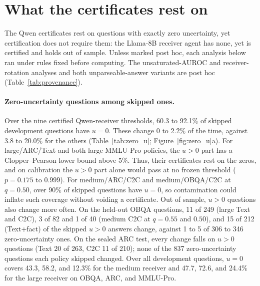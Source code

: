 \section{What the certificates rest on}\label{app:restson}

The Qwen certificates rest on questions with exactly zero uncertainty, yet certification does not require them: the Llama-8B receiver agent has none, yet is certified and holds out of sample. Unless marked post hoc, each analysis below ran under rules fixed before computing. The unsaturated-AUROC and receiver-rotation analyses and both unparseable-answer variants are post hoc (Table~\ref{tab:provenance}).

\paragraph{Zero-uncertainty questions among skipped ones.} Over the nine certified Qwen-receiver thresholds, 60.3 to 92.1\% of skipped development questions have $u=0$. These change 0 to 2.2\% of the time, against 3.8 to 20.0\% for the others (Table~\ref{tab:zero_u}; Figure~\ref{fig:zero_u}a). For large/ARC/Text and both large MMLU-Pro policies, the $u>0$ part has a Clopper--Pearson lower bound above 5\%. Thus, their certificates rest on the zeros, and on calibration the $u>0$ part alone would pass at no frozen threshold ($p=0.175$ to $0.999$). For medium/ARC/C2C and medium/OBQA/C2C at $q=0.50$, over 90\% of skipped questions have $u=0$, so contamination \citep{deng2024contamination} could inflate such coverage without voiding a certificate. Out of sample, $u>0$ questions also change more often. On the held-out OBQA questions, 11 of 249 (large Text and C2C), 3 of 82 and 1 of 40 (medium C2C at $q=0.55$ and $0.50$), and 15 of 212 (Text+fact) of the skipped $u>0$ answers change, against 1 to 5 of 306 to 346 zero-uncertainty ones. On the sealed ARC test, every change falls on $u>0$ questions (Text 20 of 263, C2C 11 of 210); none of the 837 zero-uncertainty questions each policy skipped changed. Over all development questions, $u=0$ covers 43.3, 58.2, and 12.3\% for the medium receiver and 47.7, 72.6, and 24.4\% for the large receiver on OBQA, ARC, and MMLU-Pro.

